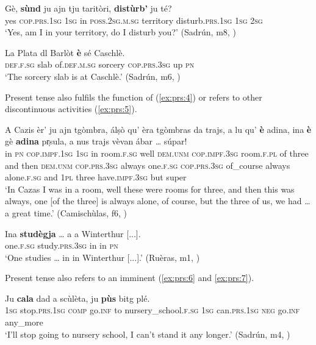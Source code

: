 \ea\label{ex:prs:2}
\gll Gè, \textbf{sùnd} ju ajn tju taritòri, \textbf{distùrb’} ju té?   \\
yes \textsc{cop.prs.1sg} \textsc{1sg} in \textsc{poss.2sg.m.sg} territory disturb.\textsc{prs.1sg} \textsc{1sg} \textsc{2sg} \\
\glt `Yes, am I in your territory, do I disturb you?' (Sadrún, m8, )
\z

\ea\label{ex:prs:3}
\gll    La Plata dl Barlòt \textbf{è} sé Caschlè.\\
\textsc{def.f.sg} slab of.\textsc{def.m.sg} sorcery \textsc{cop.prs.3sg} up \textsc{pn}\\
\glt `The sorcery slab is at Caschlè.' (Sadrún, m6, )
\z

Present tense also fulfils the function of  (\ref{ex:prs:4}) or refers to other discontinuous activities (\ref{ex:prs:5}).
 
\ea\label{ex:prs:4}
\gll    A Cazis èr’ ju ajn tgòmbra, álṣò qu’ èra tgòmbras da trajs, a lu qu’ \textbf{è} adina, ina \textbf{è} gè \textbf{adina} pr̩sula, a nus trajs vèvan ábar … súpar!\\
in \textsc{pn} \textsc{cop.impf.1sg}	\textsc{1sg} in room.\textsc{f.sg} well \textsc{dem.unm} \textsc{cop.impf.3sg} room.\textsc{f.pl} of three and then \textsc{dem.unm} \textsc{cop.prs.3sg} always  one.\textsc{f.sg} \textsc{cop.prs.3sg} of\_course always alone.\textsc{f.sg} and \textsc{1pl} three have.\textsc{impf.3sg} but {} super\\
\glt `In Cazas I was in a room, well these were rooms for three, and then this was always, one [of the three] is always alone, of course, but the three of us, we had … a great time.' (Camischùlas, f6, )
\z

\ea\label{ex:prs:5}
\gll    Ina \textbf{studègja} … a a Winterthur [...].\\
one.\textsc{f.sg} study.\textsc{prs.3sg} {} in in \textsc{pn}\\
\glt `One studies … in in Winterthur [...].' (Ruèras, m1, )
\z

Present tense also refers to an imminent  (\ref{ex:prs:6} and \ref{ex:prs:7}). 

\ea\label{ex:prs:6}
\gll  Ju \textbf{cala} dad  a scùlèta, ju \textbf{pùs} bitg  plé.\\
\textsc{1sg} stop.\textsc{prs.1sg} \textsc{comp} go.\textsc{inf} to nursery\_school.\textsc{f.sg} \textsc{1sg} can.\textsc{prs.1sg} \textsc{neg} go.\textsc{inf} any\_more  \\
\glt `I’ll stop going to nursery school, I can’t stand it any longer.' (Sadrún, m4, )
\z


